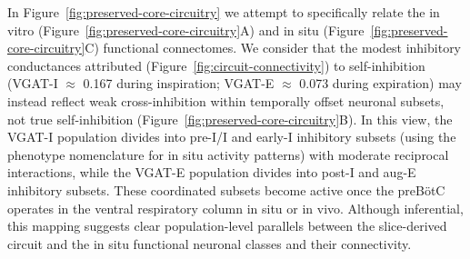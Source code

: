 \documentclass[
]{article}
\newcommand{\figref}[1]{Figure~\ref{#1}}
\newcommand{\figpanelref}[2]{Figure~\ref{#1}#2}
\begin{document}
In \figref{fig:preserved-core-circuitry} we attempt to specifically relate the in vitro (\figpanelref{fig:preserved-core-circuitry}{A}) and in situ (\figpanelref{fig:preserved-core-circuitry}{C}) functional connectomes. We consider that the modest inhibitory conductances attributed (\figref{fig:circuit-connectivity}) to self-inhibition (VGAT-I \(\approx\) 0.167 during inspiration; VGAT-E \(\approx\) 0.073 during expiration) may instead reflect weak cross-inhibition within temporally offset neuronal subsets, not true self-inhibition (\figpanelref{fig:preserved-core-circuitry}{B}). In this view, the VGAT-I population divides into pre-I/I and early-I inhibitory subsets (using the phenotype nomenclature for in situ activity patterns) with moderate reciprocal interactions, while the VGAT-E population divides into post-I and aug-E inhibitory subsets. These coordinated subsets become active once the preBötC operates in the ventral respiratory column in situ or in vivo. Although inferential, this mapping suggests clear population-level parallels between the slice-derived circuit and the in situ functional neuronal classes and their connectivity.
\end{document}

